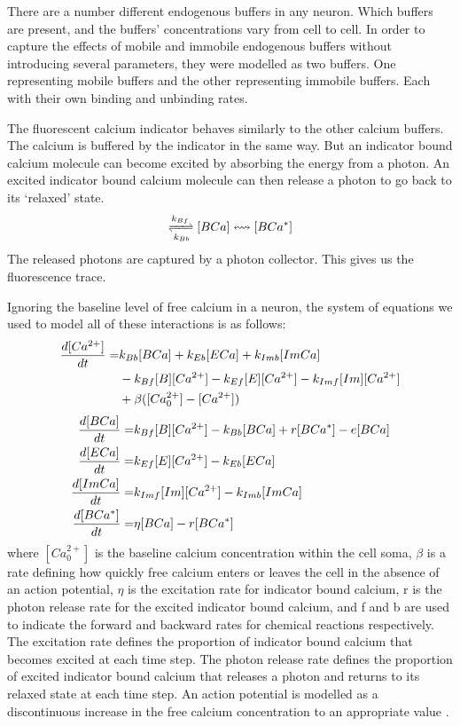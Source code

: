 There are a number different endogenous buffers in any neuron. Which buffers are present, and the buffers’ concentrations vary from cell to cell. In order to capture the effects of mobile and immobile endogenous buffers without introducing several parameters, they were modelled as two buffers. One representing mobile buffers and the other representing immobile buffers. Each with their own binding and unbinding rates.

The fluorescent calcium indicator behaves similarly to the other calcium buffers. The calcium is buffered by the indicator in the same way. But an indicator bound calcium molecule can become excited by absorbing the energy from a photon. An excited indicator bound calcium molecule can then release a photon to go back to its ‘relaxed’ state.
\begin{align*}
    [B][Ca^{2+}] \xrightleftharpoons[k_{Bb}]{k_{Bf}} [BCa] \leftrightsquigarrow [BCa^{\ast}]
\end{align*}
The released photons are captured by a photon collector. This gives us the fluorescence trace.

Ignoring the baseline level of free calcium in a neuron, the system of equations we used to model all of these interactions is as follows:
\begin{equation} \label{eq:model_equations}
  \begin{split}
  \frac{d [Ca^{2+}]}{d t} = & k_{Bb}[BCa] + k_{Eb}[ECa] + k_{Imb}[ImCa] \\
                      & - k_{Bf}[B][Ca^{2+}]- k_{Ef} [E][Ca^{2+}] - k_{Imf}[Im][Ca^{2+}] \\
                      & + \beta ([Ca^{2+}_{0}] - [Ca^{2+}])
  \end{split}
\end{equation}
\begin{align}
  \frac{d [BCa]}{d t} = & k_{Bf}[B][Ca^{2+}] - k_{Bb}[BCa] + r[BCa^{*}] - e[BCa] \\
  \frac{d [ECa]}{d t} = & k_{Ef}[E][Ca^{2+}] - k_{Eb}[ECa] \\
  \frac{d [ImCa]}{d t} = & k_{Imf}[Im][Ca^{2+}] - k_{Imb}[ImCa] \\
  \frac{d [BCa^{*}]}{d t} = & \eta[BCa] - r[BCa^{*}]
\end{align}
where $[Ca^{2+}_{0}]$ is the baseline calcium concentration within the cell soma, $\beta$ is a rate defining how quickly free calcium enters or leaves the cell in the absence of an action potential, $\eta$ is the excitation rate for indicator bound calcium, r is the photon release rate for the excited indicator bound calcium, and f and b are used to indicate the forward and backward rates for chemical reactions respectively. The excitation rate defines the proportion of indicator bound calcium that becomes excited at each time step. The photon release rate defines the proportion of excited indicator bound calcium that releases a photon and returns to its relaxed state at each time step. An action potential is modelled as a discontinuous increase in the free calcium concentration to an appropriate value  \parencite{maravall}.


